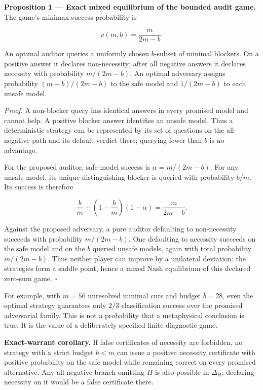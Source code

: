 \documentclass[11pt,a4paper]{article}
\begin{document}

\textbf{Proposition 1 --- Exact mixed equilibrium of the bounded audit
game.} The game's minimax success probability is

\nopagebreak[4]

\[
\boxed{v(m,b)=\frac{m}{2m-b}.}
\]

An optimal auditor queries a uniformly chosen \(b\)-subset of minimal
blockers. On a positive answer it declares non-necessity; after all
negative answers it declares necessity with probability \(m/(2m-b)\). An
optimal adversary assigns probability \((m-b)/(2m-b)\) to the safe model
and \(1/(2m-b)\) to each unsafe model.

\emph{Proof.} A non-blocker query has identical answers in every
promised model and cannot help. A positive blocker answer identifies an
unsafe model. Thus a deterministic strategy can be represented by its
set of questions on the all-negative path and its default verdict there;
querying fewer than \(b\) is no advantage.

For the proposed auditor, safe-model success is \(\alpha=m/(2m-b)\). For
any unsafe model, its unique distinguishing blocker is queried with
probability \(b/m\). Its success is therefore

\nopagebreak[4]

\[
\frac bm+\left(1-\frac bm\right)(1-\alpha)
=\frac m{2m-b}.
\]

Against the proposed adversary, a pure auditor defaulting to
non-necessity succeeds with probability \(m/(2m-b)\). One defaulting to
necessity succeeds on the safe model and on the \(b\) queried unsafe
models, again with total probability \(m/(2m-b)\). Thus neither player
can improve by a unilateral deviation: the strategies form a saddle
point, hence a mixed Nash equilibrium of this declared zero-sum game.
\(\square\)

For example, with \(m=56\) unresolved minimal cuts and budget \(b=28\),
even the optimal strategy guarantees only \(2/3\) classification success
over the promised adversarial family. This is not a probability that a
metaphysical conclusion is true. It is the value of a deliberately
specified finite diagnostic game.

\textbf{Exact-warrant corollary.} If false certificates of necessity are
forbidden, no strategy with a strict budget \(b<m\) can issue a positive
necessity certificate with positive probability on the safe model while
remaining correct on every promised alternative. Any all-negative branch
omitting \(H\) is also possible in \(\Delta_H\); declaring necessity on
it would be a false certificate there.
\end{document}
